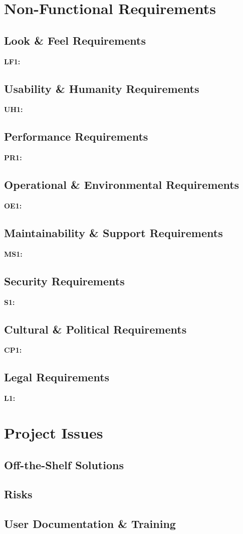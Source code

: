 \documentclass[titlepage]{article}
\begin{document}
 
 \section{Non-Functional Requirements}
 \subsection{Look \& Feel Requirements}
 \textbf{LF1:} %
 
 \subsection{Usability \& Humanity Requirements}
 \textbf{UH1:} %
 
 \subsection{Performance Requirements}
 \textbf{PR1:} %
 
 \subsection{Operational \& Environmental Requirements}
 \textbf{OE1:} %
 
 \subsection{Maintainability \& Support Requirements}
 \textbf{MS1:} %
 
 \subsection{Security Requirements}
 \textbf{S1:} %
 
 \subsection{Cultural \& Political Requirements}
 \textbf{CP1:} %
 
 \subsection{Legal Requirements}
 \textbf{L1:} %
 
 
 \section{Project Issues}
 \subsection{Off-the-Shelf Solutions}
 
 \subsection{Risks}
 
 \subsection{User Documentation \& Training}
 
 
 \pagebreak
 \printindex
 
\end{document}
